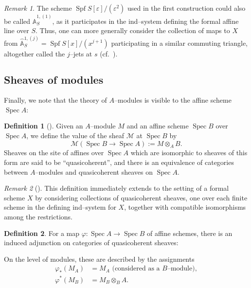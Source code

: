 \documentclass{amsart}
\newcommand{\A}{\widehat{\mathbb{A}}}
\newcommand{\<}{\langle}
\renewcommand{\>}{\rangle}
\renewcommand{\phi}{\varphi}
\newcommand{\eps}{\varepsilon}
\newcommand{\CatOf}[1]{\mathsf{#1}}
\newcommand{\sheaf}[1]{\mathcal{#1}}
\DeclareMathOperator{\Spec}{Spec}
\DeclareMathOperator{\Spf}{Spf}
\theoremstyle{plain}
\theoremstyle{definition}
\newtheorem*{definition}{Definition}
\theoremstyle{remark}
\newtheorem*{remark}{Remark}
\begin{document}
\begin{remark}\label{jJetsRemark}
The scheme $\Spf S[\eps] / (\eps^2)$ used in the first construction could also be called $\A^{1,(1)}_S$, as it participates in the ind--system defining the formal affine line over $S$.  Thus, one can more generally consider the collection of maps to $X$ from $\A^{1,(j)}_S = \Spf S[x] / (x^{j+1})$ participating in a similar commuting triangle, altogether called the $j$--jets at $s$ (cf.\ ).
\end{remark}

\subsection{Sheaves of modules}

Finally, we note that the theory of $A$--modules is visible to the affine scheme $\Spec A$:
\begin{definition}[{\cite[Definition 2.42, Proposition 2.46]{StricklandFSFG}}]\label{QCohDefinition}
Given an $A$--module $M$ and an affine scheme $\Spec B$ over $\Spec A$, we define the value of the sheaf $\sheaf M$ at $\Spec B$ by \[\sheaf M(\Spec B \to \Spec A) := M \otimes_A B.\]  Sheaves on the site of affines over $\Spec A$ which are isomorphic to sheaves of this form are said to be ``quasicoherent'', and there is an equivalence of categories between $A$--modules and quasicoherent sheaves on $\Spec A$.
\end{definition}

\begin{remark}[{\cite[Proposition 4.47]{StricklandFSFG}}]
This definition immediately extends to the setting of a formal scheme $X$ by considering collections of quasicoherent sheaves, one over each finite scheme in the defining ind--system for $X$, together with compatible isomorphisms among the restrictions.
\end{remark}

\begin{definition}
For a map $\phi: \Spec A \to \Spec B$ of affine schemes, there is an induced adjunction on categories of quasicoherent sheaves:
\begin{center}
\end{center}
On the level of modules, these are described by the assignments
\begin{align*}
\phi_*(M_A) & = \text{$M_A$ (considered as a $B$--module)}, \\
\phi^*(M_B) & = M_B \otimes_B A.
\end{align*}
\end{definition}
\end{document}
